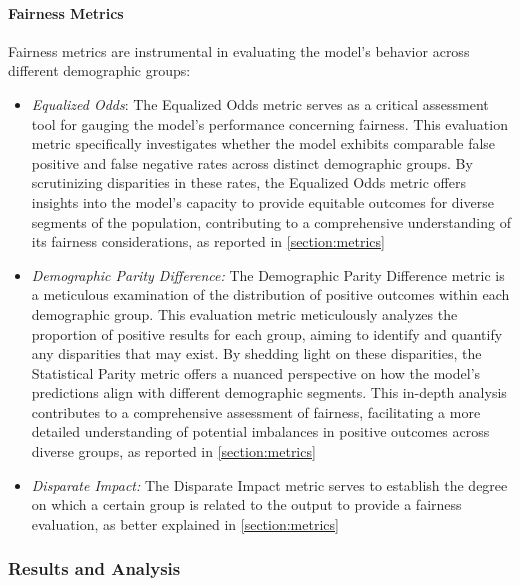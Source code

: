 \paragraph{Fairness Metrics}

Fairness metrics are instrumental in evaluating the model's behavior across different demographic groups:

\begin{itemize}
    
    \item \emph{Equalized Odds}: The Equalized Odds metric serves as a critical assessment tool for gauging the model's performance concerning fairness. This evaluation metric specifically investigates whether the model exhibits comparable false positive and false negative rates across distinct demographic groups. By scrutinizing disparities in these rates, the Equalized Odds metric offers insights into the model's capacity to provide equitable outcomes for diverse segments of the population, contributing to a comprehensive understanding of its fairness considerations, as reported in \cref{section:metrics}
    
    \item \emph{Demographic Parity Difference:} The Demographic Parity Difference metric is a meticulous examination of the distribution of positive outcomes within each demographic group. This evaluation metric meticulously analyzes the proportion of positive results for each group, aiming to identify and quantify any disparities that may exist. By shedding light on these disparities, the Statistical Parity metric offers a nuanced perspective on how the model's predictions align with different demographic segments. This in-depth analysis contributes to a comprehensive assessment of fairness, facilitating a more detailed understanding of potential imbalances in positive outcomes across diverse groups, as reported in \cref{section:metrics}

    \item \emph{Disparate Impact:} The Disparate Impact metric serves to establish the degree on which a certain group is related to the output to provide a fairness evaluation, as better explained in \cref{section:metrics}

\end{itemize}

\subsubsection{Results and Analysis}

